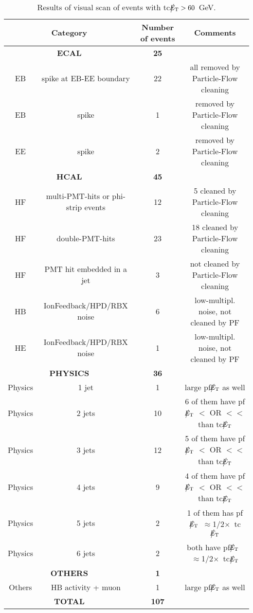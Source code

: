 \begin{table}[htbp]
  \begin{center}
    \begin{tabular}{|c|c|c|c|}
      \hline
      \multicolumn{2}{|c|}{Category} & Number of events  & Comments   \\ 
      \hline\hline
      \multicolumn{2}{|c|}{\bf ECAL} & \bf{25}      &  \\
      \hline
      EB & spike at EB-EE boundary & 22 & all removed by Particle-Flow cleaning \\     
      EB & spike & 1 & removed by Particle-Flow cleaning \\     
      EE & spike & 2 & removed by Particle-Flow cleaning \\     
      \hline    
      \multicolumn{2}{|c|}{\bf HCAL} & \bf{45}      &  \\
      \hline
      HF & multi-PMT-hits or phi-strip events & 12 & 5 cleaned by Particle-Flow cleaning \\           
      HF & double-PMT-hits & 23 & 18 cleaned by Particle-Flow cleaning \\           
      HF & PMT hit embedded in a jet & 3 & not cleaned by Particle-Flow cleaning \\           
      HB & IonFeedback/HPD/RBX noise & 6 & low-multipl. noise, not cleaned by PF\\           
      HE & IonFeedback/HPD/RBX noise & 1 & low-multipl. noise, not cleaned by PF \\           
      \hline    
      \multicolumn{2}{|c|}{\bf PHYSICS} & \bf{36}      &  \\
      \hline
      Physics & 1 jet & 1 & large pf$\big\slash\hspace{-1.6ex}{E_\text{T}}$ as well \\
      Physics & 2 jets & 10 & 6 of them have pf$\big\slash\hspace{-1.6ex}{E_\text{T}}$ $<$ OR $<<$ than tc$\big\slash\hspace{-1.6ex}{E_\text{T}}$ \\
      Physics & 3 jets & 12 & 5 of them have pf$\big\slash\hspace{-1.6ex}{E_\text{T}}$ $<$ OR $<<$ than tc$\big\slash\hspace{-1.6ex}{E_\text{T}}$ \\
      Physics & 4 jets & 9 & 4 of them have pf$\big\slash\hspace{-1.6ex}{E_\text{T}}$ $<$ OR $<<$ than tc$\big\slash\hspace{-1.6ex}{E_\text{T}}$ \\
      Physics & 5 jets & 2 & 1 of them has pf$\big\slash\hspace{-1.6ex}{E_\text{T}}$~$\approx$1/2$\times$~tc$\big\slash\hspace{-1.6ex}{E_\text{T}}$\\
      Physics & 6 jets & 2 & both have pf$\big\slash\hspace{-1.6ex}{E_\text{T}}$~$\approx$1/2$\times$~tc$\big\slash\hspace{-1.6ex}{E_\text{T}}$\\
      \hline
      \multicolumn{2}{|c|}{\bf OTHERS} & \bf{1}      &  \\
      \hline          
      Others & HB activity + muon & 1 & large pf$\big\slash\hspace{-1.6ex}{E_\text{T}}$ as well \\
      \hline          
      \multicolumn{2}{|c|}{\bf TOTAL} & \bf{107}      &  \\
      \hline
    \end{tabular}
    \caption{Results of visual scan of events with tc$\big\slash\hspace{-1.6ex}{E_\text{T}}>60$~GeV.}        
    \label{tab:tcMETskim}
  \end{center}
\end{table}
